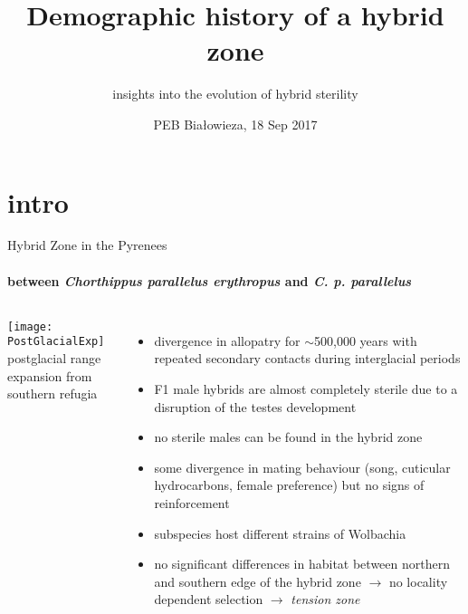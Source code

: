 \documentclass[xcolor=pdftex,dvipsnames,table, handout]{beamer}
\title{Demographic history of a hybrid zone}
\subtitle{insights into the evolution of hybrid sterility \vskip80pt}
\institute{
\raggedright
{\hskip-3pt Claudius Kerth \& \\Roger Butlin}\\[5pt]
	Animal and Plant Science\\[3pt]
	Sheffield University, UK\\[5pt]
	\textit{c.kerth@shef.ac.uk}
	\vskip10pt
}
\date{\scriptsize  PEB Bia\l owieza, 18 Sep 2017}
\begin{document}

{
%
\frame{
\titlepage	%
}
}

\section{intro}


\begin{frame}{Hybrid Zone in the Pyrenees}
\framesubtitle{between \textit{Chorthippus parallelus erythropus} and \textit{C. p. parallelus}}
\scriptsize
\begin{columns}
\centering
\texttt{[image: PostGlacialExp]}
\\postglacial range expansion from southern refugia
\begin{itemize}
\item divergence in allopatry for $\sim$500,000 years with repeated secondary contacts during interglacial periods\smallskip
\item F1 male hybrids are almost completely sterile due to a disruption of the testes development\smallskip
\item no sterile males can be found in the hybrid zone\smallskip
\item some divergence in mating behaviour (song, cuticular hydrocarbons, female preference) but no signs of reinforcement\smallskip
\item subspecies host different strains of Wolbachia\smallskip
\item no significant differences in habitat between northern and southern edge of the hybrid zone $\rightarrow$ no locality dependent selection $\rightarrow$ \emph{tension zone}
\end{itemize}
\end{columns}
\end{frame}

\end{document}
